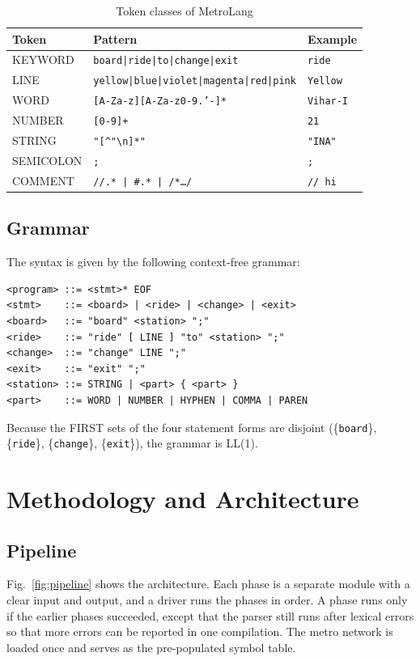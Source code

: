 \documentclass[conference]{IEEEtran}
\begin{document}
\begin{table}[t]
\caption{Token classes of MetroLang}\label{tab:tokens}
\centering\footnotesize
\begin{tabular}{@{}l l l@{}}
\toprule
\textbf{Token} & \textbf{Pattern} & \textbf{Example}\\
\midrule
KEYWORD & \texttt{board|ride|to|change|exit} & \texttt{ride}\\
LINE & \texttt{yellow|blue|violet|magenta|red|pink} & \texttt{Yellow}\\
WORD & \texttt{[A-Za-z][A-Za-z0-9.'-]*} & \texttt{Vihar-I}\\
NUMBER & \texttt{[0-9]+} & \texttt{21}\\
STRING & \texttt{"[\^{}"\textbackslash n]*"} & \texttt{"INA"}\\
SEMICOLON & \texttt{;} & \texttt{;}\\
COMMENT & \texttt{//.*\,|\,\#.*\,|\,/*\ldots*/} & \texttt{// hi}\\
\bottomrule
\end{tabular}
\end{table}

\subsection{Grammar}
The syntax is given by the following context-free grammar:
\begin{lstlisting}
<program> ::= <stmt>* EOF
<stmt>    ::= <board> | <ride> | <change> | <exit>
<board>   ::= "board" <station> ";"
<ride>    ::= "ride" [ LINE ] "to" <station> ";"
<change>  ::= "change" LINE ";"
<exit>    ::= "exit" ";"
<station> ::= STRING | <part> { <part> }
<part>    ::= WORD | NUMBER | HYPHEN | COMMA | PAREN
\end{lstlisting}
Because the FIRST sets of the four statement forms are disjoint (\{\texttt{board}\}, \{\texttt{ride}\}, \{\texttt{change}\}, \{\texttt{exit}\}), the grammar is LL(1).

\section{Methodology and Architecture}\label{sec:method}

\subsection{Pipeline}
Fig.~\ref{fig:pipeline} shows the architecture. Each phase is a separate module with a clear input and output, and a driver runs the phases in order. A phase runs only if the earlier phases succeeded, except that the parser still runs after lexical errors so that more errors can be reported in one compilation. The metro network is loaded once and serves as the pre-populated symbol table.
\end{document}
